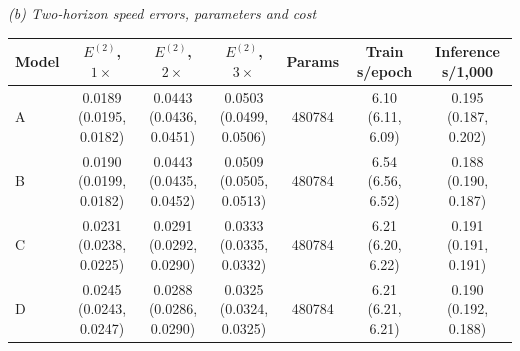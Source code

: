{\small\textit{(b) Two-horizon speed errors, parameters and cost}}\par\vspace{2pt}
\par\begingroup\centering\fontsize{8.5}{10.5}\selectfont\setlength{\parskip}{0pt}\setlength{\tabcolsep}{4pt}
\begin{tabular}{@{}lcccccc@{}}
\toprule
Model & $E^{(2)}$, $1\times$ & $E^{(2)}$, $2\times$ & $E^{(2)}$, $3\times$ & Params & Train s/epoch & Inference s/1,000 \\
\midrule
A & \shortstack{0.0189\\[-1pt](0.0195, 0.0182)} & \shortstack{0.0443\\[-1pt](0.0436, 0.0451)} & \shortstack{0.0503\\[-1pt](0.0499, 0.0506)} & 480784 & \shortstack{6.10\\[-1pt](6.11, 6.09)} & \shortstack{0.195\\[-1pt](0.187, 0.202)} \\
B & \shortstack{0.0190\\[-1pt](0.0199, 0.0182)} & \shortstack{0.0443\\[-1pt](0.0435, 0.0452)} & \shortstack{0.0509\\[-1pt](0.0505, 0.0513)} & 480784 & \shortstack{6.54\\[-1pt](6.56, 6.52)} & \shortstack{0.188\\[-1pt](0.190, 0.187)} \\
C & \shortstack{0.0231\\[-1pt](0.0238, 0.0225)} & \shortstack{0.0291\\[-1pt](0.0292, 0.0290)} & \shortstack{0.0333\\[-1pt](0.0335, 0.0332)} & 480784 & \shortstack{6.21\\[-1pt](6.20, 6.22)} & \shortstack{0.191\\[-1pt](0.191, 0.191)} \\
D & \shortstack{0.0245\\[-1pt](0.0243, 0.0247)} & \shortstack{0.0288\\[-1pt](0.0286, 0.0290)} & \shortstack{0.0325\\[-1pt](0.0324, 0.0325)} & 480784 & \shortstack{6.21\\[-1pt](6.21, 6.21)} & \shortstack{0.190\\[-1pt](0.192, 0.188)} \\
\bottomrule
\end{tabular}\par\endgroup\vspace{5pt}
